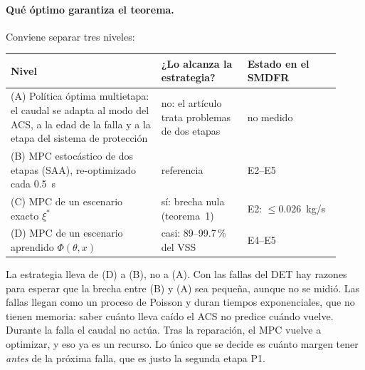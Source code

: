 \paragraph{Qué óptimo garantiza el teorema.} Conviene separar tres niveles:
\begin{center}\small
\begin{tabular}{@{}>{\raggedright\arraybackslash}p{0.42\linewidth}>{\raggedright\arraybackslash}p{0.24\linewidth}>{\raggedright\arraybackslash}p{0.26\linewidth}@{}}
\toprule
Nivel & ¿Lo alcanza la estrategia? & Estado en el SMDFR\\
\midrule
(A) Política óptima multietapa: el caudal se adapta al modo del ACS, a la edad de la falla y a
la etapa del sistema de protección & no: el artículo trata problemas de dos etapas & no medido\\
(B) MPC estocástico de dos etapas (SAA), re-optimizado cada 0.5~s & referencia & E2--E5\\
(C) MPC de un escenario exacto $\xi^*$ & sí: brecha nula (teorema~1) & E2: $\le0.026$~kg/s\\
(D) MPC de un escenario aprendido $\Phi(\theta,x)$ & casi: 89--99.7\,\% del VSS & E4--E5\\
\bottomrule
\end{tabular}
\end{center}
La estrategia lleva de (D) a (B), no a (A). Con las fallas del DET hay razones para esperar que la
brecha entre (B) y (A) sea pequeña, aunque no se midió. Las fallas llegan como un proceso de
Poisson y duran tiempos exponenciales, que no tienen memoria: saber cuánto lleva caído el ACS no
predice cuándo vuelve. Durante la falla el caudal no actúa. Tras la reparación, el MPC vuelve a
optimizar, y eso ya es un recurso. Lo único que se decide es cuánto margen tener \emph{antes} de la
próxima falla, que es justo la segunda etapa P1.

